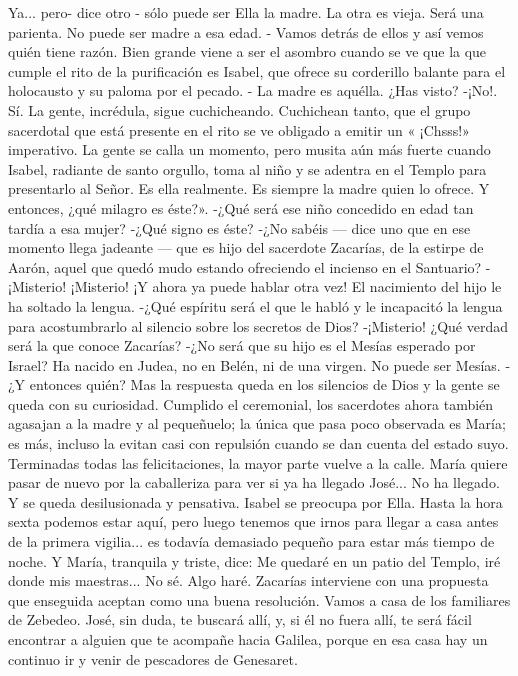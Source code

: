 \documentclass[12pt]{book} %
\begin{document}
Ya... pero- dice otro - sólo puede ser Ella la madre. La otra es vieja. Será una parienta. No puede ser madre a esa edad. - Vamos detrás de ellos y así vemos quién tiene razón. 
Bien grande viene a ser el asombro cuando se ve que la que cumple el rito de la purificación es Isabel, que ofrece su 
corderillo balante para el holocausto y su paloma por el pecado. - La madre es aquélla. ¿Has visto? 
-¡No!. 
Sí. 
La gente, incrédula, sigue cuchicheando. Cuchichean tanto, que el grupo sacerdotal que está presente en el rito se ve obligado a emitir un « ¡Chsss!» imperativo. La gente se calla un momento, pero musita aún más fuerte cuando Isabel, radiante de santo orgullo, toma al niño y se adentra en el Templo para presentarlo al Señor. 
Es ella realmente. 
Es siempre la madre quien lo ofrece. 
Y entonces, ¿qué milagro es éste?». 
-¿Qué será ese niño concedido en edad tan tardía a esa mujer? -¿Qué signo es éste? 
-¿No sabéis — dice uno que en ese momento llega jadeante — que es hijo del sacerdote Zacarías, de la estirpe de Aarón, aquel que quedó mudo estando ofreciendo el incienso en el Santuario? 
-¡Misterio! ¡Misterio! ¡Y ahora ya puede hablar otra vez! El nacimiento del hijo le ha soltado la lengua. 
-¿Qué espíritu será el que le habló y le incapacitó la lengua para acostumbrarlo al silencio sobre los secretos de Dios? -¡Misterio! ¿Qué verdad será la que conoce Zacarías? 
-¿No será que su hijo es el Mesías esperado por Israel? 
Ha nacido en Judea, no en Belén, ni de una virgen. No puede ser Mesías. 
-¿Y entonces quién? 
Mas la respuesta queda en los silencios de Dios y la gente se queda con su curiosidad. 
Cumplido el ceremonial, los sacerdotes ahora también agasajan a la madre y al pequeñuelo; la única que pasa poco 
observada es María; es más, incluso la evitan casi con repulsión cuando se dan cuenta del estado suyo. 
Terminadas todas las felicitaciones, la mayor parte vuelve a la calle. María quiere pasar de nuevo por la caballeriza para 
ver si ya ha llegado José... No ha llegado. Y se queda desilusionada y pensativa. Isabel se preocupa por Ella. 
Hasta la hora sexta podemos estar aquí, pero luego tenemos que irnos para llegar a casa antes de la primera vigilia... es todavía demasiado pequeño para estar más tiempo de noche. 
Y María, tranquila y triste, dice: 
Me quedaré en un patio del Templo, iré donde mis maestras... No sé. Algo haré. 
Zacarías interviene con una propuesta que enseguida aceptan como una buena resolución. 
Vamos a casa de los familiares de Zebedeo. José, sin duda, te buscará allí, y, si él no fuera allí, te será fácil encontrar a 
alguien que te acompañe hacia Galilea, porque en esa casa hay un continuo ir y venir de pescadores de Genesaret. 
\end{document}
